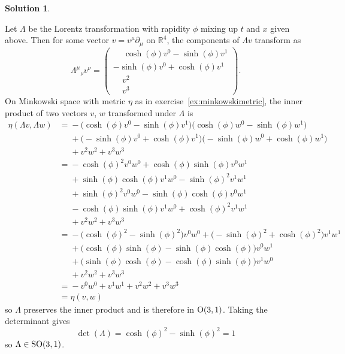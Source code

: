 \documentclass[11pt, a4paper]{report}
\theoremstyle{definition}
\newtheorem{solution}{Solution}[part]
\newenvironment{sol}{\begin{solution}}{\end{solution}\pagebreak[3]}
\renewcommand*{\O}{\ensuremath\text{O}}
\newcommand*{\SO}{\ensuremath\text{SO}}
\begin{document}
\begin{sol}\label{sol:so31lorentztransformations}

Let $\Lambda$ be the Lorentz transformation with rapidity $\phi$ mixing up $t$ and $x$ given above.
Then for some vector $v = v^\mu \partial_\mu$ on $\mathbb{R}^4$, the components of $\Lambda v$ transform as
\[
    {\Lambda^\mu}_\nu v^\nu = \begin{pmatrix}
        \!\phantom{-} \cosh(\phi) v^0 - \sinh(\phi) v^1 \\
        -\sinh(\phi) v^0 + \cosh(\phi) v^1 \\
        \;\;\;\; v^2 \\
        \;\;\;\; v^3
    \end{pmatrix}.
\]
On Minkowski space with metric $\eta$ as in exercise~\ref{ex:minkowskimetric}, the inner product of two vectors $v$, $w$ transformed under $\Lambda$ is
\begin{align*}
    \eta(\Lambda v, \Lambda w)
        &\mathrel{=}{} - \bigl(\cosh(\phi) v^0 - \sinh(\phi) v^1 \bigr)
            \bigl( \cosh(\phi) w^0 - \sinh(\phi) w^1 \bigr) \\
        &\mathrel{\phantom{=}}{} + \bigl(-\sinh(\phi) v^0 + \cosh(\phi) v^1 \bigr)
                                   \bigl(-\sinh(\phi) w^0 + \cosh(\phi) w^1 \bigr) \\
        &\mathrel{\phantom{=}}{} + v^2 w^2 + v^3 w^3 \\
        &\mathrel{=}{} - {\cosh(\phi)}^2 v^0 w^0 + \cosh(\phi) \sinh(\phi) v^0 w^1 \\
        &\mathrel{\phantom{=}}{} + \sinh(\phi) \cosh(\phi) v^1 w^0 - {\sinh(\phi)}^2 v^1 w^1 \\
        &\mathrel{\phantom{=}}{} + {\sinh(\phi)}^2 v^0 w^0 - \sinh(\phi) \cosh(\phi) v^0 w^1 \\
        &\mathrel{\phantom{=}}{} - \cosh(\phi) \sinh(\phi) v^1 w^0 + {\cosh(\phi)}^2 v^1 w^1 \\
        &\mathrel{\phantom{=}}{} + v^2 w^2 + v^3 w^3 \\
        &\mathrel{=}{} - \bigl( {\cosh(\phi)}^2 - {\sinh(\phi)}^2 \bigr) v^0 w^0
                       + \bigl( -{\sinh(\phi)}^2 + {\cosh(\phi)}^2) v^1 w^1 \\
        &\mathrel{\phantom{=}}{} + \bigl( \cosh(\phi) \sinh(\phi) - \sinh(\phi) \cosh(\phi) \bigr) v^0 w^1 \\
        &\mathrel{\phantom{=}}{} + \bigl( \sinh(\phi) \cosh(\phi) - \cosh(\phi) \sinh(\phi) \bigr) v^1 w^0 \\
        &\mathrel{\phantom{=}}{} + v^2 w^2 + v^3 w^3 \\
        &\mathrel{=}{} - v^0 w^0 + v^1 w^1 + v^2 w^2 + v^3 w^3 \\
        &= \eta(v, w)
\end{align*}
so $\Lambda$ preserves the inner product and is therefore in $\O(3, 1)$.
Taking the determinant gives
\[
    \det(\Lambda) = {\cosh(\phi)}^2 - {\sinh(\phi)}^2 = 1
\]
so $\Lambda \in \SO(3, 1)$.


\end{sol}
\end{document}
